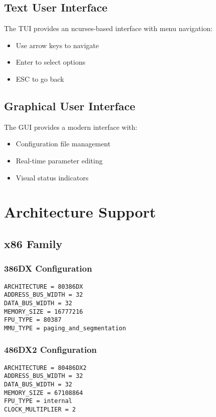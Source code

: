\documentclass[a4paper,11pt]{book}
\begin{document}
\section{Text User Interface}
The TUI provides an ncurses-based interface with menu navigation:
\begin{itemize}
    \item Use arrow keys to navigate
    \item Enter to select options
    \item ESC to go back
\end{itemize}

\section{Graphical User Interface}
The GUI provides a modern interface with:
\begin{itemize}
    \item Configuration file management
    \item Real-time parameter editing
    \item Visual status indicators
\end{itemize}

\chapter{Architecture Support}
\section{x86 Family}
\subsection{386DX Configuration}
\begin{lstlisting}[style=fxmlstyle]
ARCHITECTURE = 80386DX
ADDRESS_BUS_WIDTH = 32
DATA_BUS_WIDTH = 32
MEMORY_SIZE = 16777216
FPU_TYPE = 80387
MMU_TYPE = paging_and_segmentation
\end{lstlisting}

\subsection{486DX2 Configuration}
\begin{lstlisting}[style=fxmlstyle]
ARCHITECTURE = 80486DX2
ADDRESS_BUS_WIDTH = 32
DATA_BUS_WIDTH = 32
MEMORY_SIZE = 67108864
FPU_TYPE = internal
CLOCK_MULTIPLIER = 2
\end{lstlisting}
\end{document}
